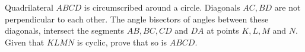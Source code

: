 Quadrilateral $ABCD$ is circumscribed around a circle. Diagonals $AC,BD$ are not perpendicular to each other. The angle bisectors of angles between these diagonals, intersect the segments $AB,BC,CD$ and $DA$ at points $K,L,M$ and $N$. Given that $KLMN$ is cyclic, prove that so is $ABCD$.